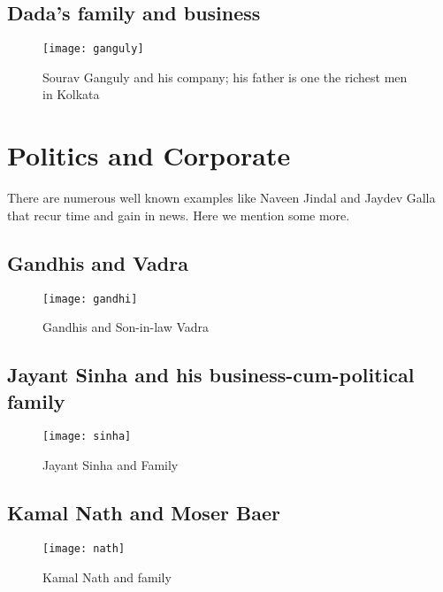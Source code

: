 \subsection{Dada's family and business}

\begin{figure}[H]
\begin{center}  
\texttt{[image: ganguly]} 
\caption{Sourav Ganguly and his company; his father is one the richest men in Kolkata}
\label{fig:ganguly}
\end{center}
\end{figure}



\section{Politics and Corporate}

There are numerous well known examples like Naveen Jindal and Jaydev Galla that recur time and gain in news. Here we mention some more.

\subsection{Gandhis and Vadra}

\begin{figure}[H]
\begin{center}  
\texttt{[image: gandhi]} 
\caption{Gandhis and Son-in-law Vadra}
\label{fig:gandhi}
\end{center}
\end{figure}

\subsection{Jayant Sinha and his business-cum-political family}

\begin{figure}[H]
\begin{center}  
\texttt{[image: sinha]} 
\caption{Jayant Sinha and Family}
\label{fig:sinha}
\end{center}
\end{figure}

\subsection{Kamal Nath and Moser Baer}

\begin{figure}[H]
\begin{center}  
\texttt{[image: nath]} 
\caption{Kamal Nath and family}
\label{fig:nath}
\end{center}
\end{figure}